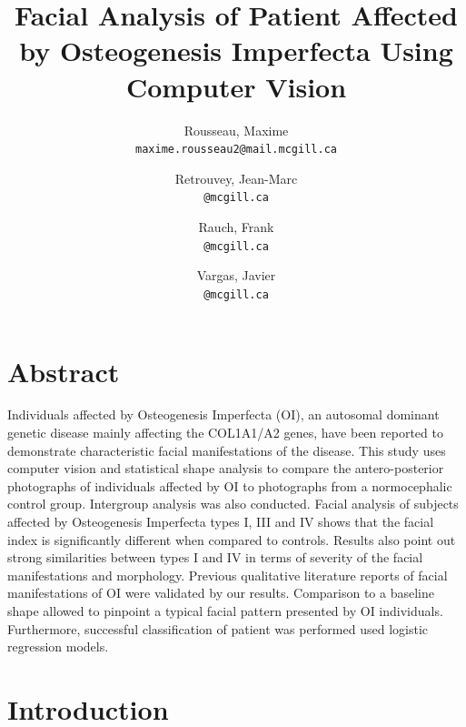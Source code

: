 \documentclass{article}
\title{Facial Analysis of Patient Affected by Osteogenesis
Imperfecta Using Computer Vision}
\author{
Rousseau, Maxime\\
\texttt{maxime.rousseau2@mail.mcgill.ca}
\and
Retrouvey, Jean-Marc\\
\texttt{@mcgill.ca}
\and
Rauch, Frank\\
\texttt{@mcgill.ca}
\and
Vargas, Javier\\
\texttt{@mcgill.ca}
}
\begin{document}
\maketitle
\begin{multicols}{2}


\section{Abstract}

Individuals affected by Osteogenesis Imperfecta (OI), an autosomal
dominant genetic disease mainly affecting the COL1A1/A2 genes, have been
reported to demonstrate characteristic facial manifestations of the
disease. This study uses computer vision and statistical shape analysis
to compare the antero-posterior photographs of individuals affected by
OI to photographs from a normocephalic control group. Intergroup
analysis was also conducted. Facial analysis of subjects affected by
Osteogenesis Imperfecta types I, III and IV shows that the facial index
is significantly different when compared to controls. Results also point
out strong similarities between types I and IV in terms of severity of
the facial manifestations and morphology. Previous qualitative
literature reports of facial manifestations of OI were validated by our
results. Comparison to a baseline shape allowed to pinpoint a typical
facial pattern presented by OI individuals. Furthermore, successful
classification of patient was performed used logistic regression models.

\section{Introduction}


\end{multicols}
\end{document}

